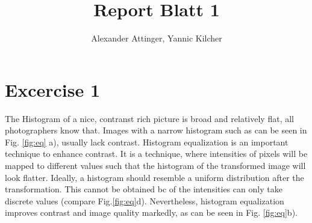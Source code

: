 \documentclass[11pt,a4paper]{article}
\author{Alexander Attinger, Yannic Kilcher}
\title{Report Blatt 1}
\begin{document}
\maketitle
\section{Excercise 1}
The Histogram of a nice, contranst rich picture is broad and relatively flat, all photographers know that. Images with a narrow histogram such as can be seen in Fig. \ref{fig:eq} a), usually lack contrast. Histogram equalization is an important technique to enhance contrast. It is a technique, where intensities of pixels will be mapped to different values such that the histogram of the transformed image will look flatter. Ideally, a histogram should resemble a uniform distribution after the transformation. This cannot be obtained bc of the intensities can only take discrete values (compare Fig.\ref{fig:eq}d). Nevertheless, histogram equalization improves contrast and image quality markedly, as can be seen in Fig. \ref{fig:eq}b).
\end{document}
